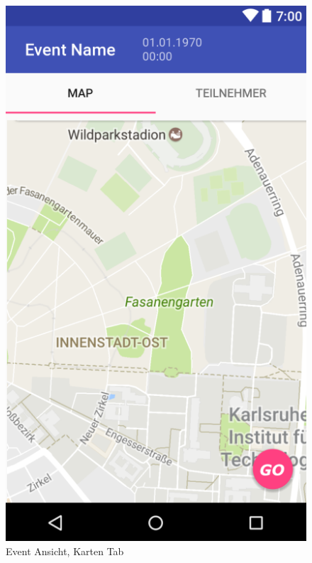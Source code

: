 \documentclass[parskip=full]{scrartcl}
\begin{document}
\begin{figure}[H]
	\centering
	\includegraphics[width=.7\textwidth]{GUI/AndroidStudio/event_info_navi.PNG}
	\caption{Event Ansicht, Karten Tab}	
\end{figure}
\end{document}
